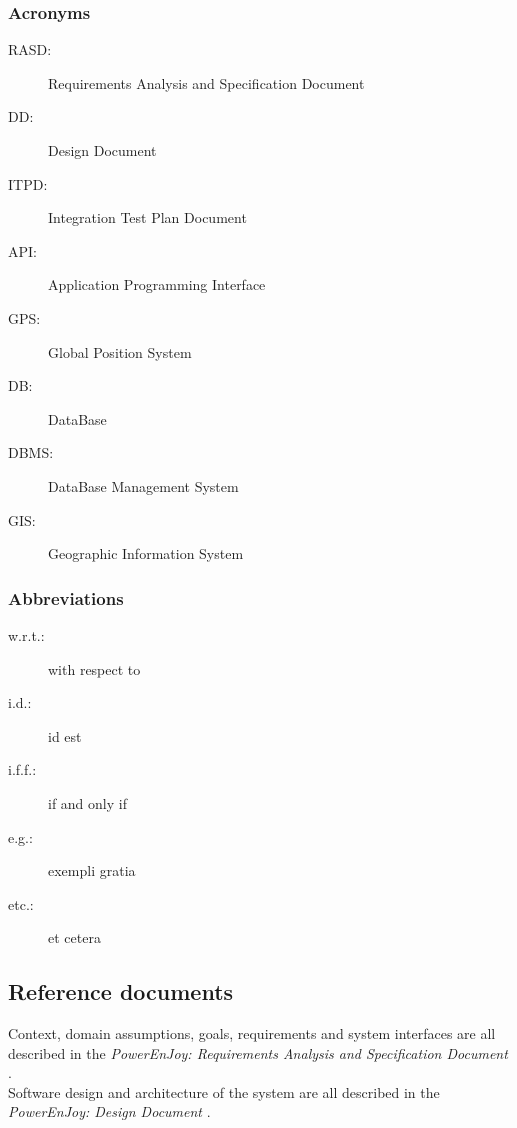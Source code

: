 \subsubsection{Acronyms}
	\begin{description}
		\item [RASD:] Requirements Analysis and Specification Document
		\item [DD:] Design Document
		\item [ITPD:] Integration Test Plan Document
		\item [API:] Application Programming Interface
		\item [GPS:] Global Position System
		\item [DB:] DataBase
		\item [DBMS:] DataBase Management System
		\item [GIS:] Geographic Information System
	\end{description}
\subsubsection{Abbreviations}
	\begin{description}
		\item [w.r.t.:] with respect to
		\item [i.d.:] id est
		\item [i.f.f.:] if and only if
		\item [e.g.:] exempli gratia
		\item [etc.:] et cetera
	\end{description}

\subsection{Reference documents}
Context, domain assumptions, goals, requirements and system interfaces are all described in the \emph{PowerEnJoy: Requirements Analysis and Specification Document} \cite{RASD}.\\
Software design and architecture of the system are all described in the \emph{PowerEnJoy: Design Document} \cite{DD}.\\

